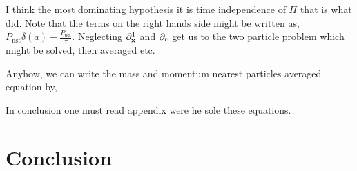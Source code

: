 \documentclass[12pt]{My_preprint}
\begin{document}
I think the most dominating hypothesis it is time independence of $\Pi$ that is what \citet{hinch1977averaged} did.
Note that the terms on the right hands side might be written as, $P_\text{nst}\delta(a) - \frac{P_\text{nst}}{\tau}$. 
Neglecting $\partial_\textbf{x}^1$ and $\partial_\textbf{r}$ get us to the two particle problem which might be solved, then averaged etc. 

Anyhow, we can write the mass and momentum nearest particles averaged equation by,

In conclusion one must read \citet{zhang2021ensemble} appendix were he sole these equations. 


\section{Conclusion}




\appendix
\end{document}
